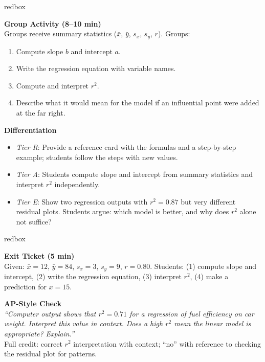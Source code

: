 \documentclass[10pt]{article}
\begin{document}
\begin{skillbox}{redbox}
\begin{minipage}[t]{0.48\linewidth}
    \textbf{Group Activity (8--10 min)}\\
    Groups receive summary statistics ($\bar{x}$, $\bar{y}$, $s_x$, $s_y$, $r$). Groups:
    \begin{enumerate}
        \item Compute slope $b$ and intercept $a$.
        \item Write the regression equation with variable names.
        \item Compute and interpret $r^2$.
        \item Describe what it would mean for the model if an influential point were added at the far right.
    \end{enumerate}
\end{minipage}
\hfill
\begin{minipage}[t]{0.48\linewidth}
    \textbf{Differentiation}
    \begin{itemize}
        \item \textit{Tier R}: Provide a reference card with the formulas and a step-by-step example; students follow the steps with new values.
        \item \textit{Tier A}: Students compute slope and intercept from summary statistics and interpret $r^2$ independently.
        \item \textit{Tier E}: Show two regression outputs with $r^2 = 0.87$ but very different residual plots. Students argue: which model is better, and why does $r^2$ alone not suffice?
    \end{itemize}
\end{minipage}
\end{skillbox}

\begin{skillbox}{redbox}
\begin{minipage}[t]{0.48\linewidth}
    \textbf{Exit Ticket (5 min)}\\
    Given: $\bar{x} = 12$, $\bar{y} = 84$, $s_x = 3$, $s_y = 9$, $r = 0.80$. Students: (1) compute slope and intercept, (2) write the regression equation, (3) interpret $r^2$, (4) make a prediction for $x = 15$.
\end{minipage}
\hfill
\begin{minipage}[t]{0.48\linewidth}
    \textbf{AP-Style Check}\\
    \textit{``Computer output shows that $r^2 = 0.71$ for a regression of fuel efficiency on car weight. Interpret this value in context. Does a high $r^2$ mean the linear model is appropriate? Explain.''}\\[4pt]
    Full credit: correct $r^2$ interpretation with context; ``no'' with reference to checking the residual plot for patterns.
\end{minipage}
\end{skillbox}
\end{document}

